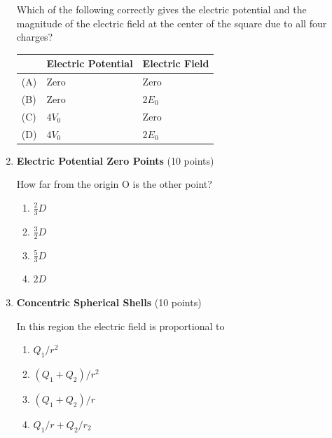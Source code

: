 \begin{enumerate}
  Which of the following correctly gives the electric potential and the magnitude of the electric field at the center of the square due to all four charges?
  
  \begin{center}
  \begin{tabular}{|l|l|l|}
  \hline
  & \textbf{Electric Potential} & \textbf{Electric Field} \\
  \hline
  (A) & Zero & Zero \\
  (B) & Zero & $2E_0$ \\
  (C) & $4V_0$ & Zero \\
  (D) & $4V_0$ & $2E_0$ \\
  \hline
  \end{tabular}
  \end{center}
  \begin{subanswer}
  \end{subanswer}

  \item \textbf{Electric Potential Zero Points} (10 points)\\
  
  How far from the origin O is the other point?
  \begin{enumerate}[label=(\Alph*)]
    \item $\frac{2}{3}D$
    \item $\frac{3}{2}D$
    \item $\frac{5}{3}D$
    \item $2D$
  \end{enumerate}
  \begin{subanswer}
  \end{subanswer}

  \item \textbf{Concentric Spherical Shells} (10 points)\\
  
  In this region the electric field is proportional to
  \begin{enumerate}[label=(\Alph*)]
    \item $Q_1/r^2$
    \item $(Q_1 + Q_2)/r^2$
    \item $(Q_1 + Q_2)/r$
    \item $Q_1/r + Q_2/r_2$
  \end{enumerate}
  \begin{subanswer}
  \end{subanswer}


\end{enumerate}

